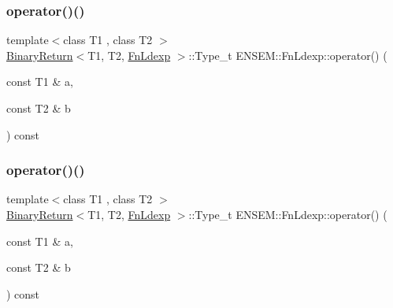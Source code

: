 \subsubsection{\texorpdfstring{operator()()}{operator()()}\hspace{0.1cm}{\footnotesize\ttfamily [1/3]}}
{\footnotesize\ttfamily template$<$class T1 , class T2 $>$ \\
\mbox{\hyperlink{structENSEM_1_1BinaryReturn}{Binary\+Return}}$<$T1, T2, \mbox{\hyperlink{structENSEM_1_1FnLdexp}{Fn\+Ldexp}} $>$\+::Type\+\_\+t E\+N\+S\+E\+M\+::\+Fn\+Ldexp\+::operator() (\begin{DoxyParamCaption}\item[{const T1 \&}]{a,  }\item[{const T2 \&}]{b }\end{DoxyParamCaption}) const\hspace{0.3cm}{\ttfamily [inline]}}

\mbox{\label{structENSEM_1_1FnLdexp_a018e96259f66cd8923edf0610629b52c}} 
\subsubsection{\texorpdfstring{operator()()}{operator()()}\hspace{0.1cm}{\footnotesize\ttfamily [2/3]}}
{\footnotesize\ttfamily template$<$class T1 , class T2 $>$ \\
\mbox{\hyperlink{structENSEM_1_1BinaryReturn}{Binary\+Return}}$<$T1, T2, \mbox{\hyperlink{structENSEM_1_1FnLdexp}{Fn\+Ldexp}} $>$\+::Type\+\_\+t E\+N\+S\+E\+M\+::\+Fn\+Ldexp\+::operator() (\begin{DoxyParamCaption}\item[{const T1 \&}]{a,  }\item[{const T2 \&}]{b }\end{DoxyParamCaption}) const\hspace{0.3cm}{\ttfamily [inline]}}

\mbox{\label{structENSEM_1_1FnLdexp_a018e96259f66cd8923edf0610629b52c}} 
